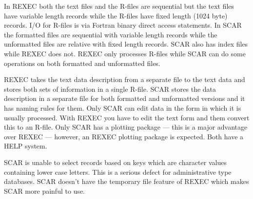 In REXEC both the text files and the R-files are sequential but the text files
have variable length records while the R-files have fixed length (1024 byte)
records.
I/O for R-files is via Fortran binary direct access statements.
In SCAR the formatted files are sequential with variable length records while
the unformatted files are relative with fixed length records.
SCAR also has index files while REXEC does not.
REXEC only processes R-files while SCAR can do some operations on both
formatted and unformatted files.

REXEC takes the text data description from a separate file to the text data
and stores both sets of information in a single R-file.
SCAR stores the data description in a separate file for both formatted and
unformatted versions and it has naming rules for them.
Only SCAR can edit data in the form in which it is usually processed.
With REXEC you have to edit the text form and them convert this to an R-file.
Only SCAR has a plotting package --- this is a major advantage over REXEC ---
however, an REXEC plotting package is expected.
Both have a HELP system.

SCAR is unable to select records based on keys which are character values
containing lower case letters.
This is a serious defect for administrative type databases.
SCAR doesn't have the temporary file feature of REXEC which makes SCAR more
painful to use.

